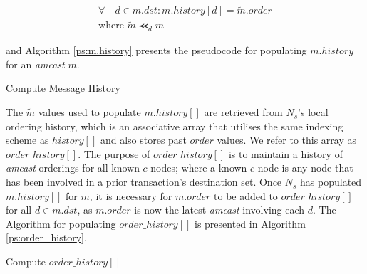\begin{enumerate}
         \begin{equation*}
             \begin{split}
	             \forall \quad d \in m.dst : m.history[d] = \tilde{m}.order \\
	             \text{where } \tilde{m} \llcurly_d m
             \end{split}
         \end{equation*}
         
        and Algorithm \ref{ps:m.history} presents the pseudocode for populating $m.history$ for an \emph{amcast} $m$.  
        
      \begin{algorithm}
       \caption{Compute Message History}
        \label{ps:m.history}
        \begin{algorithmic}[1]
                \ELSE
                \ENDIF
            \ENDFOR
        \end{algorithmic}
    \end{algorithm}
         
        The $\tilde{m}$ values used to populate $m.history[]$ are retrieved from $N_s$'s local ordering history, which is an associative array that utilises the same indexing scheme as $history[]$ and also stores past $order$ values.  We refer to this array as $order\_history[]$.  The purpose of $order\_history[]$ is to maintain a history of \emph{amcast} orderings for all known $c$-nodes; where a known $c$-node is any node that has been involved in a prior transaction's destination set.  Once $N_s$ has populated $m.history[]$ for $m$, it is necessary for $m.order$ to be added to $order\_history[]$ for all $d \in m.dst$, as $m.order$ is now the latest \emph{amcast} involving each $d$.  The Algorithm for populating $order\_history[]$ is presented in Algorithm \ref{ps:order_history}.  
		        
    \begin{algorithm}[h]
       \caption{Compute $order\_history[]$}
        \label{ps:order_history}
        \begin{algorithmic}[1]
                \ENDIF
            \ENDFOR
        \end{algorithmic}
    \end{algorithm}           		        
		        

\end{enumerate}
